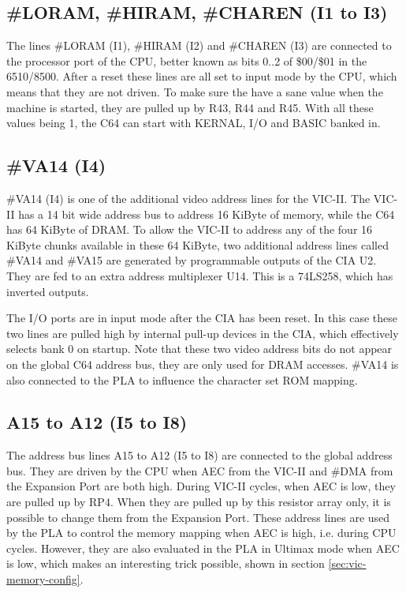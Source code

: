\subsection{\#LORAM, \#HIRAM, \#CHAREN (I1 to I3)}


The lines \#LORAM (I1), \#HIRAM (I2) and \#CHAREN (I3) are connected to the
processor port of the CPU, better known as bits 0..2 of \$00/\$01 in the
6510/8500. After a reset these lines are all set to input mode by the CPU,
which means that they are not driven. To make sure the have a sane value
when the machine is started, they are pulled up by R43, R44 and R45. With
all these values being 1, the C64 can start with KERNAL, I/O and BASIC
banked in.

\subsection{\#VA14 (I4)}

\#VA14 (I4) is one of the additional video address lines for the VIC-II. The
VIC-II has a 14 bit wide address bus to address 16 KiByte of memory, while
the C64 has 64 KiByte of DRAM. To allow the VIC-II to address any of the
four 16 KiByte chunks available in these 64 KiByte, two additional address
lines called \#VA14 and \#VA15 are generated by programmable outputs of the
CIA U2. They are fed to an extra address multiplexer U14. This is a 74LS258,
which has inverted outputs.

The I/O ports are in input mode after the CIA has been reset. In this case
these two lines are pulled high by internal pull-up devices in the CIA,
which effectively selects bank 0 on startup. Note that these two video
address bits do not appear on the global C64 address bus, they are only used
for DRAM accesses. \#VA14 is also connected to the PLA to influence the
character set ROM mapping.

\subsection{A15 to A12 (I5 to I8)}

The address bus lines A15 to A12 (I5 to I8) are connected to the global
address bus. They are driven by the CPU when AEC from the VIC-II and \#DMA
from the Expansion Port are both high. During VIC-II cycles, when AEC is
low, they are pulled up by RP4. When they are pulled up by this resistor
array only, it is possible to change them from the Expansion Port. These
address lines are used by the PLA to control the memory mapping when AEC is
high, i.e. during CPU cycles. However, they are also evaluated in the PLA in
Ultimax mode when AEC is low, which makes an interesting trick possible,
shown in section \ref{sec:vic-memory-config}.

